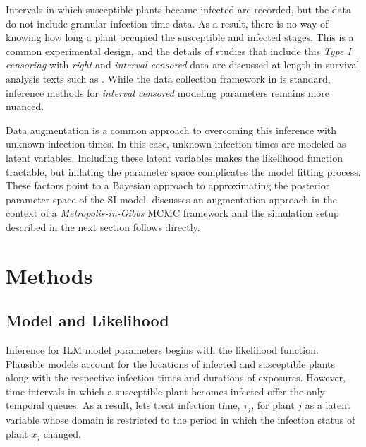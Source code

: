 \documentclass{uwstat572}
\begin{document}
Intervals in which susceptible plants became infected are recorded, but the data do not include granular infection time data.  
As a result, there is no way of knowing how long a plant occupied the susceptible and infected stages.
This is a common experimental design, and the details of studies that include this \textit{Type I censoring} with \textit{right} and \textit{interval censored} data are discussed at length in survival analysis texts such as \citet{Klein}. 
While the data collection framework in \citet{Brown} is standard, inference methods for \textit{interval censored} modeling parameters remains more nuanced.

Data augmentation is a common approach to overcoming this inference with unknown infection times. 
In this case, unknown infection times are modeled as latent variables. 
Including these latent variables makes the likelihood function tractable, but inflating the parameter space complicates the model fitting process. 
These factors point to a Bayesian approach to approximating the posterior parameter space of the SI model. 
\citet{Jewell} discusses an augmentation approach in the context of a \textit{Metropolis-in-Gibbs} MCMC framework and the simulation setup described in the next section follows directly. 

\section{Methods}
\subsection{Model and Likelihood}

Inference for ILM model parameters begins with the likelihood function. 
Plausible models account for the locations of infected and susceptible plants along with the respective infection times and durations of exposures. 
However, time intervals in which a susceptible plant becomes infected offer the only temporal queues. 
As a result, lets treat infection time, $\tau_j$, for plant $j$ as a latent variable whose domain is restricted to the period in which the infection status of plant $x_j$ changed. 
\end{document}
